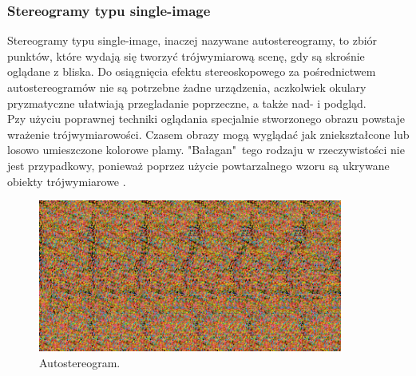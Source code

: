 \subsubsection{Stereogramy typu single-image} 
Stereogramy typu single-image, inaczej nazywane autostereogramy, to zbiór punktów, które wydają się tworzyć trójwymiarową scenę, gdy są skrośnie oglądane z bliska. Do osiągnięcia efektu stereoskopowego za pośrednictwem autostereogramów nie są potrzebne żadne urządzenia, aczkolwiek okulary pryzmatyczne ułatwiają przegladanie poprzeczne, a także nad- i podgląd.\\
Pzy użyciu poprawnej techniki oglądania specjalnie stworzonego obrazu powstaje wrażenie trójwymiarowości. Czasem obrazy mogą wyglądać jak zniekształcone lub losowo umieszczone kolorowe plamy. "Bałagan"\ tego rodzaju w rzeczywistości nie jest przypadkowy, ponieważ poprzez użycie powtarzalnego wzoru są ukrywane obiekty trójwymiarowe \cite{stereoscopythesis}.
\begin{figure}[H]
		\centering
 		\includegraphics[width=10cm]{autostereogram.png}
    	\caption{Autostereogram.}
 		\label{rys2}
\end{figure}

